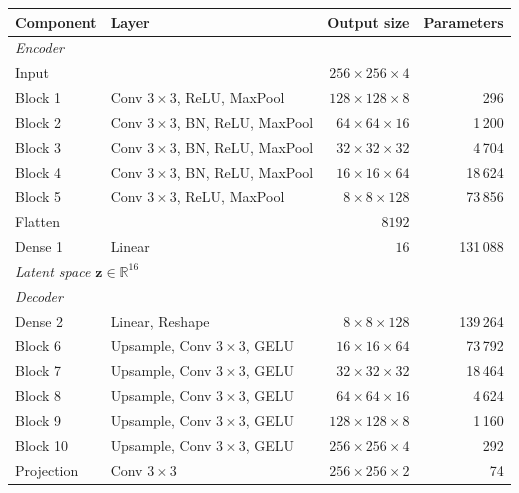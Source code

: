 \begin{table}[H]
\centering

\small
\begin{tabular}{@{}llrr@{}}
\toprule
\textbf{Component} & \textbf{Layer} & \textbf{Output size} & \textbf{Parameters} \\
\midrule
\multicolumn{4}{l}{\textit{Encoder}} \\
Input           &                                    & $256\times256\times4$ &           \\
Block 1         & Conv $3\times3$, ReLU, MaxPool      & $128\times128\times8$ & 296       \\
Block 2         & Conv $3\times3$, BN, ReLU, MaxPool  & $64\times64\times16$  & 1\,200    \\
Block 3         & Conv $3\times3$, BN, ReLU, MaxPool  & $32\times32\times32$  & 4\,704    \\
Block 4         & Conv $3\times3$, BN, ReLU, MaxPool  & $16\times16\times64$  & 18\,624   \\
Block 5         & Conv $3\times3$, ReLU, MaxPool      & $8\times8\times128$   & 73\,856   \\
Flatten         &                                    & $8192$                &           \\
Dense 1         & Linear                             & $16$                  & 131\,088  \\
\midrule
\multicolumn{4}{l}{\textit{Latent space $\mathbf{z} \in \mathbb{R}^{16}$}} \\
\midrule
\multicolumn{4}{l}{\textit{Decoder}} \\
Dense 2         & Linear, Reshape                    & $8\times8\times128$   & 139\,264  \\
Block 6         & Upsample, Conv $3\times3$, GELU    & $16\times16\times64$  & 73\,792   \\
Block 7         & Upsample, Conv $3\times3$, GELU    & $32\times32\times32$  & 18\,464   \\
Block 8         & Upsample, Conv $3\times3$, GELU    & $64\times64\times16$  & 4\,624    \\
Block 9         & Upsample, Conv $3\times3$, GELU    & $128\times128\times8$ & 1\,160    \\
Block 10        & Upsample, Conv $3\times3$, GELU    & $256\times256\times4$ & 292       \\
Projection      & Conv $3\times3$                    & $256\times256\times2$ & 74        \\

\end{tabular}
\end{table}
